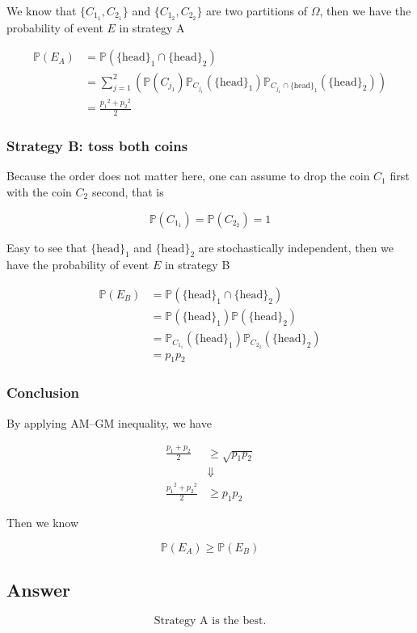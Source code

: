 \documentclass[12pt]{article}
\newcommand{\bP}{\mathbb{P}}
\begin{document}
\begin{enumerate}[label={},leftmargin=0in]
			We know that $\{C_{1_1},C_{2_1}\}$ and $\{C_{1_2},C_{2_2}\}$ are two partitions of $\Omega$, then we have the probability of event $E$ in strategy A
			
			\[
			\begin{aligned}
				\bP(E_A) &= \bP(\{\mathrm{head}\}_1\cap \{\mathrm{head}\}_2)\\
				&= \sum_{j=1}^2\left(\bP(C_{j_1})\bP_{C_{j_1}}(\{\mathrm{head}\}_1)\bP_{C_{j_1}\cap \{\mathrm{head}\}_1}(\{\mathrm{head}\}_2)\right)\\
				&= \frac{{p_1}^2 + {p_2}^2}{2}
			\end{aligned}
			\]
			
			\subsubsection*{Strategy B: toss both coins}
			
			Because the order does not matter here, one can assume to drop the coin $C_1$ first with the coin $C_2$ second, that is
			
			\[\bP(C_{1_1}) = \bP(C_{2_2}) = 1\]
			
			Easy to see that $\{\mathrm{head}\}_1$ and $\{\mathrm{head}\}_2$ are stochastically independent, then we have the probability of event $E$ in strategy B
			
			\[
			\begin{aligned}
				\bP(E_B) &= \bP(\{\mathrm{head}\}_1\cap \{\mathrm{head}\}_2)\\
				&= \bP(\{\mathrm{head}\}_1)\bP(\{\mathrm{head}\}_2)\\
				&= \bP_{C_{1_1}}(\{\mathrm{head}\}_1)\bP_{C_{2_2}}(\{\mathrm{head}\}_2)\\
				&= p_1p_2
			\end{aligned}
			\]
			
			\subsubsection*{Conclusion}
			
			By applying AM–GM inequality, we have
			
			\[
			\begin{aligned}
				\frac{p_1 + p_2}{2}&\ge \sqrt{p_1p_2}\\
				&\Downarrow\\
				\frac{{p_1}^2 + {p_2}^2}{2}&\ge p_1p_2
			\end{aligned}
			\]
			
			Then we know
			
			\[\bP(E_A) \ge \bP(E_B)\]
			
		\subsection*{Answer}
		
			\[\boxed{\text{Strategy A is the best.}}\]
	
	\end{enumerate}
\end{document}
